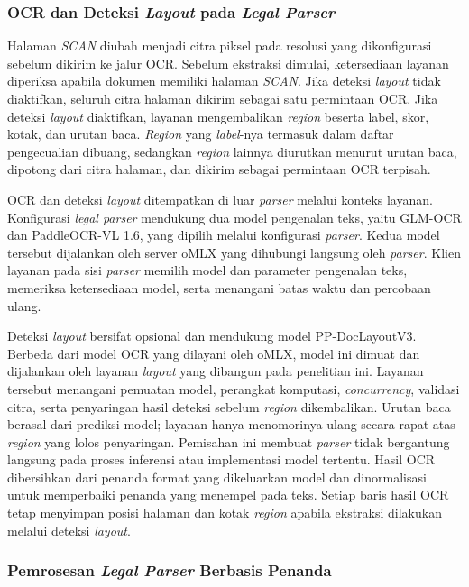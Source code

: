 \subsubsection{OCR dan Deteksi \textit{Layout} pada \textit{Legal Parser}}
\label{sec:solusi-batas-ocr}

Halaman \textit{SCAN} diubah menjadi citra piksel pada resolusi yang dikonfigurasi sebelum dikirim ke jalur OCR.
Sebelum ekstraksi dimulai, ketersediaan layanan diperiksa apabila dokumen memiliki halaman \textit{SCAN}.
Jika deteksi \textit{layout} tidak diaktifkan, seluruh citra halaman dikirim sebagai satu permintaan OCR.
Jika deteksi \textit{layout} diaktifkan, layanan mengembalikan \textit{region} beserta label, skor, kotak, dan urutan baca.
\textit{Region} yang \textit{label}-nya termasuk dalam daftar pengecualian dibuang, sedangkan \textit{region} lainnya diurutkan menurut urutan baca, dipotong dari citra halaman, dan dikirim sebagai permintaan OCR terpisah.

OCR dan deteksi \textit{layout} ditempatkan di luar \textit{parser} melalui konteks layanan.
Konfigurasi \textit{legal parser} mendukung dua model pengenalan teks, yaitu GLM-OCR dan PaddleOCR-VL 1.6, yang dipilih melalui konfigurasi \textit{parser}.
Kedua model tersebut dijalankan oleh server oMLX yang dihubungi langsung oleh \textit{parser}.
Klien layanan pada sisi \textit{parser} memilih model dan parameter pengenalan teks, memeriksa ketersediaan model, serta menangani batas waktu dan percobaan ulang.

Deteksi \textit{layout} bersifat opsional dan mendukung model PP-DocLayoutV3.
Berbeda dari model OCR yang dilayani oleh oMLX, model ini dimuat dan dijalankan oleh layanan \textit{layout} yang dibangun pada penelitian ini.
Layanan tersebut menangani pemuatan model, perangkat komputasi, \textit{concurrency}, validasi citra, serta penyaringan hasil deteksi sebelum \textit{region} dikembalikan.
Urutan baca berasal dari prediksi model; layanan hanya menomorinya ulang secara rapat atas \textit{region} yang lolos penyaringan.
Pemisahan ini membuat \textit{parser} tidak bergantung langsung pada proses inferensi atau implementasi model tertentu.
Hasil OCR dibersihkan dari penanda format yang dikeluarkan model dan dinormalisasi untuk memperbaiki penanda yang menempel pada teks.
Setiap baris hasil OCR tetap menyimpan posisi halaman dan kotak \textit{region} apabila ekstraksi dilakukan melalui deteksi \textit{layout}.

\subsubsection{Pemrosesan \textit{Legal Parser} Berbasis Penanda}
\label{sec:solusi-parser-legal}

